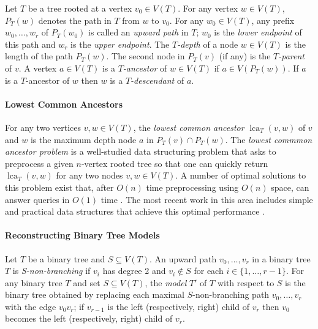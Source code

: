 \documentclass{patmorin}
\DeclareMathOperator{\lca}{lca}
\begin{document}
Let $T$ be a tree rooted at a vertex $v_0\in V(T)$.  For any vertex $w\in V(T)$, $P_T(w)$ denotes the path in $T$ from $w$ to $v_0$.  For any $w_0\in V(T)$, any prefix $w_0,\ldots,w_r$ of $P_T(w_0)$ is called an \emph{upward path} in $T$; $w_0$ is the \emph{lower endpoint} of this path and $w_r$ is the \emph{upper endpoint}.  The \emph{$T$-depth} of a node $w\in V(T)$ is the length of the path $P_T(w)$. The second node in $P_T(v)$ (if any) is the \emph{$T$-parent} of $v$.  A vertex $a\in V(T)$ is a \emph{$T$-ancestor} of $w\in V(T)$ if $a\in V(P_T(w))$. If $a$ is a $T$-ancestor of $w$ then $w$ is a \emph{$T$-descendant} of $a$.



\paragraph{Lowest Common Ancestors}

For any two vertices $v,w\in V(T)$, the \emph{lowest common ancestor} $\lca_T(v,w)$ of $v$ and $w$ is the maximum depth node $a$ in $P_T(v)\cap P_T(w)$.  The \emph{lowest commmon ancestor problem} is a well-studied data structuring problem that asks to preprocess a given $n$-vertex rooted tree so that one can quickly return $\lca_T(v,w)$ for any two nodes $v,w\in V(T)$. A number of optimal solutions to this problem exist that, after $O(n)$ time preprocessing using $O(n)$ space, can answer queries in $O(1)$ time \cite{berman.vishkin:recursive,shieber.vishkin:on,harel.tarjan:fast,alstrup.gavoille.ea:nearest,bender.farach-colton:lca,fischer.heun:theoretical}.  The most recent work in this area includes simple and practical data structures that achieve this optimal performance \cite{alstrup.gavoille.ea:nearest,bender.farach-colton:lca,fischer.heun:theoretical}.

\paragraph{Reconstructing Binary Tree Models}

Let $T$ be a binary tree and $S \subseteq V(T)$. An upward path $v_0,\ldots,v_r$ in a binary tree $T$ is \emph{S-non-branching} if $v_{i}$ has degree 2 and $v_i \notin S$ for each $i\in\{1,\ldots,r-1\}$. For any binary tree $T$ and set $S \subseteq V(T)$, the \emph{model} $T'$ of $T$ with respect to $S$ is the binary tree obtained by replacing each maximal $S$-non-branching path $v_0,\ldots,v_r$ with the edge $v_0v_r$; if $v_{r-1}$ is the left (respectively, right) child of $v_r$ then $v_0$ becomes the left (respectively, right) child of $v_r$.
\end{document}
